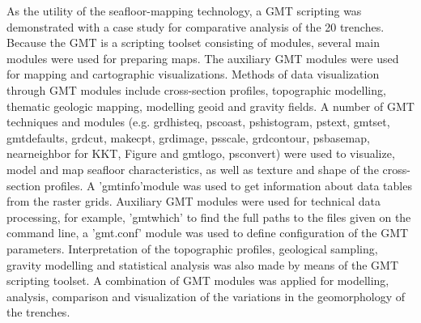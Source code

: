 \documentclass[11pt,a4paper]{report}
\begin{document}
{As the utility of the seafloor-mapping technology, a \ac{GMT} scripting was demonstrated with a case study for comparative analysis of the 20 trenches.  Because the \ac{GMT} is a scripting toolset consisting of modules, several main modules were used for preparing maps. The auxiliary \ac{GMT} modules were used for mapping and cartographic visualizations. Methods of data visualization through \ac{GMT} modules include cross-section profiles, topographic modelling, thematic geologic mapping, modelling geoid and gravity fields. A number of \ac{GMT} techniques and modules (e.g. grdhisteq, pscoast, pshistogram, pstext, gmtset, gmtdefaults, grdcut, makecpt, grdimage, psscale, grdcontour, psbasemap, nearneighbor for \ac{KKT}, Figure and gmtlogo, psconvert) were used to visualize, model and map seafloor characteristics, as well as texture and shape of the cross-section profiles. A 'gmtinfo'module was used to get information about data tables from the raster grids. Auxiliary \ac{GMT} modules were used for technical data processing, for example, 'gmtwhich' to find the full paths to the files given on the command line, a 'gmt.conf' module was used to define configuration of the \ac{GMT} parameters. Interpretation of the topographic profiles, geological sampling, gravity modelling and statistical analysis was also made by means of the \ac{GMT} scripting toolset. A combination of \ac{GMT} modules was applied for modelling, analysis, comparison and visualization of the variations in the geomorphology of the trenches.  

}
\end{document}
